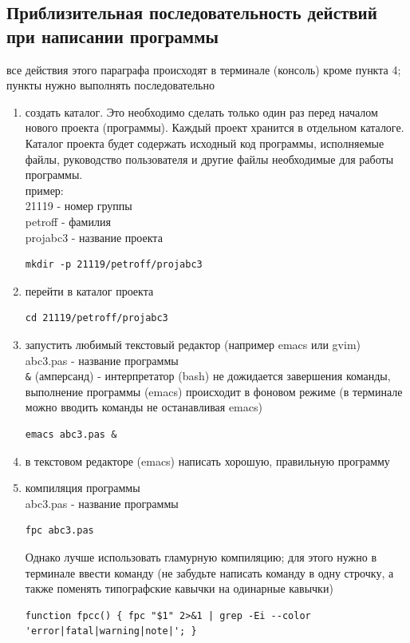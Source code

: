 \documentclass[unicode, 12pt, a4paper,oneside,fleqn]{article}
\begin{document}
\subsection{Приблизительная последовательность действий при написании программы}
все действия этого параграфа происходят в терминале (консоль) кроме
пункта 4; пункты нужно выполнять последовательно 
\begin{enumerate}
\item создать каталог. Это необходимо сделать только один раз перед
  началом нового проекта (программы). Каждый проект хранится в
  отдельном каталоге. Каталог проекта будет содержать исходный код
  программы, исполняемые файлы, руководство пользователя и другие
  файлы необходимые для работы программы.\\
  пример:\\
  21119 - номер группы\\
  petroff - фамилия\\
  projabc3 - название проекта
\begin{verbatim}
mkdir -p 21119/petroff/projabc3
\end{verbatim}
  
\item перейти в каталог проекта
\begin{verbatim}
cd 21119/petroff/projabc3
\end{verbatim}

\item запустить любимый текстовый редактор (например emacs или gvim)\\
  abc3.pas - название программы\\
  \verb!&! (амперсанд) - интерпретатор (bash) не дожидается завершения
  команды, выполнение программы (emacs) происходит в фоновом режиме
  (в терминале можно вводить команды не останавливая emacs)
\begin{verbatim}
emacs abc3.pas &
\end{verbatim}

\item в текстовом редакторе (emacs) написать хорошую, правильную
  программу

\item компиляция программы\\
  abc3.pas - название программы
\begin{verbatim}
fpc abc3.pas
\end{verbatim}
  Однако лучше использовать гламурную компиляцию; для этого нужно в терминале
  ввести команду (не забудьте написать команду в одну строчку, а также
  поменять типографские кавычки на одинарные кавычки)
 {\scriptsize
\begin{verbatim}
function fpcc() { fpc "$1" 2>&1 | grep -Ei --color 'error|fatal|warning|note|'; }
\end{verbatim}
}
 

\end{enumerate}
\end{document}
